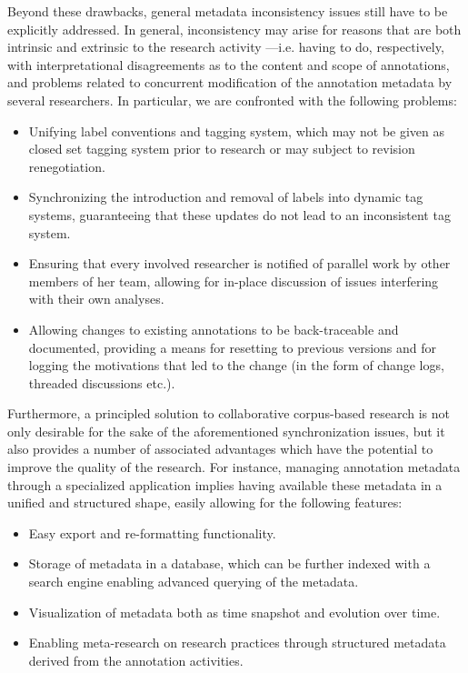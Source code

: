 \documentclass{sig-alternate}
\begin{document}
Beyond these drawbacks, general metadata inconsistency issues still have to be explicitly addressed.
In general, inconsistency may arise for reasons that are both intrinsic and extrinsic to the
research activity ---i.e. having to do, respectively, with interpretational disagreements
as to the content and scope of annotations, and problems related to concurrent modification of
the annotation metadata by several researchers. In particular, we are confronted with the
following problems:
\begin{itemize}
\item Unifying label conventions and tagging system, which may not be given as closed
  set tagging system prior to research or may subject to revision renegotiation.
\item Synchronizing the introduction and removal of labels into dynamic tag systems,
  guaranteeing that these updates do not lead to an inconsistent tag system.
\item Ensuring that every involved researcher is notified of parallel work by other members
  of her team, allowing for in-place discussion of issues interfering with their own analyses.
\item Allowing changes to existing annotations to be back-traceable and documented, providing
  a means for resetting to previous versions and for logging the motivations
  that led to the change (in the form of change logs, threaded discussions etc.).
\end{itemize}

Furthermore, a principled solution to collaborative corpus-based research is not only
desirable for the sake of the aforementioned synchronization issues, but it also provides
a number of associated advantages which have the potential to improve the quality of the research.
For instance, managing annotation metadata through a specialized application implies
having available these metadata in a unified and structured shape, easily allowing
for the following features:

\begin{itemize}
\item Easy export and re-formatting functionality.
\item Storage of metadata in a database, which can be further indexed with a search engine
  enabling advanced querying of the metadata.
\item Visualization of metadata both as time snapshot and evolution over time.
\item Enabling meta-research on research practices through structured metadata derived
  from the annotation activities.
\end{itemize}
\end{document}
